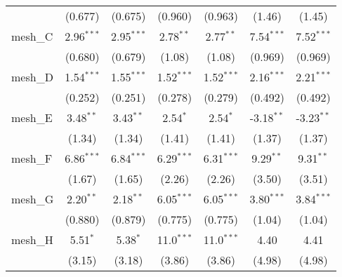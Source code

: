 \begin{tabular}{lcccccc}
                                                               & (0.677)        & (0.675)        & (0.960)       & (0.963)       & (1.46)        & (1.45)\\   
   mesh\_C                                                     & 2.96$^{***}$   & 2.95$^{***}$   & 2.78$^{**}$   & 2.77$^{**}$   & 7.54$^{***}$  & 7.52$^{***}$\\   
                                                               & (0.680)        & (0.679)        & (1.08)        & (1.08)        & (0.969)       & (0.969)\\   
   mesh\_D                                                     & 1.54$^{***}$   & 1.55$^{***}$   & 1.52$^{***}$  & 1.52$^{***}$  & 2.16$^{***}$  & 2.21$^{***}$\\   
                                                               & (0.252)        & (0.251)        & (0.278)       & (0.279)       & (0.492)       & (0.492)\\   
   mesh\_E                                                     & 3.48$^{**}$    & 3.43$^{**}$    & 2.54$^{*}$    & 2.54$^{*}$    & -3.18$^{**}$  & -3.23$^{**}$\\   
                                                               & (1.34)         & (1.34)         & (1.41)        & (1.41)        & (1.37)        & (1.37)\\   
   mesh\_F                                                     & 6.86$^{***}$   & 6.84$^{***}$   & 6.29$^{***}$  & 6.31$^{***}$  & 9.29$^{**}$   & 9.31$^{**}$\\   
                                                               & (1.67)         & (1.65)         & (2.26)        & (2.26)        & (3.50)        & (3.51)\\   
   mesh\_G                                                     & 2.20$^{**}$    & 2.18$^{**}$    & 6.05$^{***}$  & 6.05$^{***}$  & 3.80$^{***}$  & 3.84$^{***}$\\   
                                                               & (0.880)        & (0.879)        & (0.775)       & (0.775)       & (1.04)        & (1.04)\\   
   mesh\_H                                                     & 5.51$^{*}$     & 5.38$^{*}$     & 11.0$^{***}$  & 11.0$^{***}$  & 4.40          & 4.41\\   
                                                               & (3.15)         & (3.18)         & (3.86)        & (3.86)        & (4.98)        & (4.98)\\   

\end{tabular}
